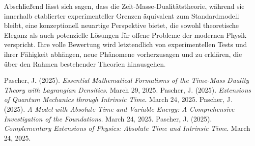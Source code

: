 \documentclass[a4paper,12pt]{article}
\begin{document}
	Abschließend lässt sich sagen, dass die Zeit-Masse-Dualitätstheorie, während sie innerhalb etablierter experimenteller Grenzen äquivalent zum Standardmodell bleibt, eine konzeptionell neuartige Perspektive bietet, die sowohl theoretische Eleganz als auch potenzielle Lösungen für offene Probleme der modernen Physik verspricht. Ihre volle Bewertung wird letztendlich von experimentellen Tests und ihrer Fähigkeit abhängen, neue Phänomene vorherzusagen und zu erklären, die über den Rahmen bestehender Theorien hinausgehen.
	
	
	\begin{thebibliography}{9}
		 Pascher, J. (2025). \textit{Essential Mathematical Formalisms of the Time-Mass Duality Theory with Lagrangian Densities}. March 29, 2025.
		 Pascher, J. (2025). \textit{Extensions of Quantum Mechanics through Intrinsic Time}. March 24, 2025.
		 Pascher, J. (2025). \textit{A Model with Absolute Time and Variable Energy: A Comprehensive Investigation of the Foundations}. March 24, 2025.
		 Pascher, J. (2025). \textit{Complementary Extensions of Physics: Absolute Time and Intrinsic Time}. March 24, 2025.
	\end{thebibliography}
	
\end{document}
